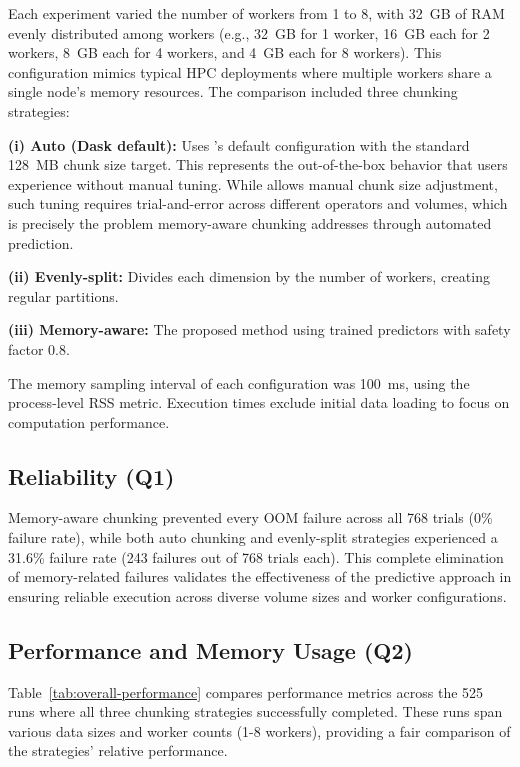 Each experiment varied the number of \dask workers from 1 to 8, with 32~GB of \ac{RAM} evenly distributed among workers (e.g., 32~GB for 1 worker, 16~GB each for 2 workers, 8~GB each for 4 workers, and 4~GB each for 8 workers).
This configuration mimics typical \ac{HPC} deployments where multiple workers share a single node's memory resources.
The comparison included three chunking strategies:

\textbf{(i) Auto (Dask default):} Uses \dask's default configuration with the standard 128~MB chunk size target.
This represents the out-of-the-box behavior that users experience without manual tuning.
While \dask allows manual chunk size adjustment, such tuning requires trial-and-error across different operators and volumes, which is precisely the problem memory-aware chunking addresses through automated prediction.

\textbf{(ii) Evenly-split:} Divides each dimension by the number of workers, creating regular partitions.

\textbf{(iii) Memory-aware:} The proposed method using trained predictors with safety factor 0.8.

The memory sampling interval of each configuration was 100~ms, using the process-level \ac{RSS} metric.
Execution times exclude initial data loading to focus on computation performance.

\subsection{Reliability (Q1)}

Memory-aware chunking prevented every \ac{OOM} failure across all 768 trials (0\% failure rate), while both auto chunking and evenly-split strategies experienced a 31.6\% failure rate (243 failures out of 768 trials each).
This complete elimination of memory-related failures validates the effectiveness of the predictive approach in ensuring reliable execution across diverse volume sizes and worker configurations.

\subsection{Performance and Memory Usage (Q2)}

Table~\ref{tab:overall-performance} compares performance metrics across the 525 runs where all three chunking strategies successfully completed.
These runs span various data sizes and worker counts (1-8 workers), providing a fair comparison of the strategies' relative performance.

